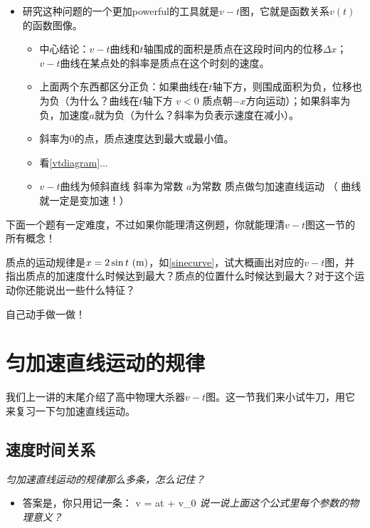 \documentclass[a4paper,9pt]{ctexart}
\begin{document}
\begin{itemize}
\begin{itemize}
\end{itemize}
\item
研究这种问题的一个更加powerful的工具就是$v-t$图，它就是函数关系$v(t)$的函数图像。
\begin{itemize}
\item
中心结论：$v-t$曲线和$t$轴围成的面积是质点在这段时间内的位移$\Delta x$；$v-t$曲线在某点处的斜率是质点在这个时刻的速度。
\item
上面两个东西都区分正负：如果曲线在$t$轴下方，则围成面积为负，位移也为负（为什么？曲线在$t$轴下方 \so $v<0$ \so 质点朝$-x$方向运动）；如果斜率为负，加速度$a$就为负（为什么？斜率为负表示速度在减小）。
\item
斜率为0的点，质点速度达到最大或最小值。
\item
看\cref{vtdiagram}...
\item
$v-t$曲线为倾斜直线 \so 斜率为常数 \so $a$为常数 \so 质点做匀加速直线运动 （ 曲线就一定是变加速！）
\end{itemize}
\end{itemize}
下面一个题有一定难度，不过如果你能理清这例题，你就能理清$v-t$图这一节的所有概念！
\begin{eg}
质点的运动规律是$x = 2\sin  t\  ({\rm m})$，如\cref{sinecurve}，试大概画出对应的$v-t$图，并指出质点的加速度什么时候达到最大？质点的位置什么时候达到最大？对于这个运动你还能说出一些什么特征？
\end{eg}
\begin{ans}
自己动手做一做！
\vspace{8cm}
\end{ans}





\newpage
\section{匀加速直线运动的规律}
我们上一讲的末尾介绍了高中物理大杀器$v-t$图。这一节我们来小试牛刀，用它来复习一下匀加速直线运动。
\subsection{速度时间关系}
\emph{匀加速直线运动的规律那么多条，怎么记住？}
\begin{itemize}
\item
答案是，你只用记一条：
\beq
v = at + v_0
\eeq
\emph{说一说上面这个公式里每个参数的物理意义？}
\end{itemize}
\end{document}
